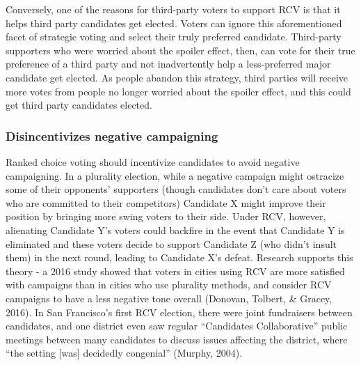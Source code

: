 \documentclass[12pt,twoside]{reedthesis}
\begin{document}
Conversely, one of the reasons for third-party voters to support RCV is that it helps third party candidates get elected. Voters can ignore this aforementioned facet of strategic voting and select their truly preferred candidate. Third-party supporters who were worried about the spoiler effect, then, can vote for their true preference of a third party and not inadvertently help a less-preferred major candidate get elected. As people abandon this strategy, third parties will receive more votes from people no longer worried about the spoiler effect, and this could get third party candidates elected.

\hypertarget{disincentivizes-negative-campaigning}{%
\subsubsection{Disincentivizes negative campaigning}\label{disincentivizes-negative-campaigning}}

Ranked choice voting should incentivize candidates to avoid negative campaigning. In a plurality election, while a negative campaign might ostracize some of their opponents' supporters (though candidates don't care about voters who are committed to their competitors) Candidate X might improve their position by bringing more swing voters to their side. Under RCV, however, alienating Candidate Y's voters could backfire in the event that Candidate Y is eliminated and these voters decide to support Candidate Z (who didn't insult them) in the next round, leading to Candidate X's defeat. Research supports this theory - a 2016 study showed that voters in cities using RCV are more satisfied with campaigns than in cities who use plurality methods, and consider RCV campaigns to have a less negative tone overall (Donovan, Tolbert, \& Gracey, 2016). In San Francisco's first RCV election, there were joint fundraisers between candidates, and one district even saw regular ``Candidates Collaborative'' public meetings between many candidates to discuss issues affecting the district, where ``the setting {[}was{]} decidedly congenial'' (Murphy, 2004).
\end{document}
